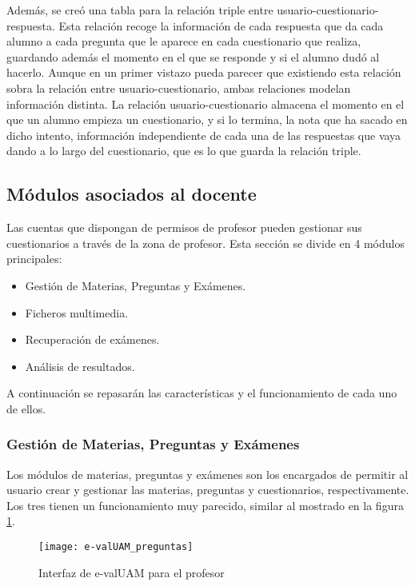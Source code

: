 Además, se creó una tabla para la relación triple entre usuario-cuestionario-respuesta. Esta relación recoge la información de cada respuesta que da cada alumno a cada pregunta que le aparece en cada cuestionario que realiza, guardando además el momento en el que se responde y si el alumno dudó al hacerlo. Aunque en un primer vistazo pueda parecer que existiendo esta relación sobra la relación entre usuario-cuestionario, ambas relaciones modelan información distinta. La relación usuario-cuestionario almacena el momento en el que un alumno empieza un cuestionario, y si lo termina, la nota que ha sacado en dicho intento, información independiente de cada una de las respuestas que vaya dando a lo largo del cuestionario, que es lo que guarda la relación triple.


\subsection{Módulos asociados al docente}

Las cuentas que dispongan de permisos de profesor pueden gestionar sus cuestionarios a través de la zona de profesor. Esta sección se divide en 4 módulos principales:

\begin{itemize}
	\item Gestión de Materias, Preguntas y Exámenes.
	\item Ficheros multimedia.
	\item Recuperación de exámenes.
	\item Análisis de resultados.
\end{itemize}

A continuación se repasarán las características y el funcionamiento de cada uno de ellos.

\subsubsection{Gestión de Materias, Preguntas y Exámenes}

Los módulos de materias, preguntas y exámenes son los encargados de permitir al usuario crear y gestionar las materias, preguntas y cuestionarios, respectivamente. Los tres tienen un funcionamiento muy parecido, similar al mostrado en la figura \ref{fig:e-valUAM interfaz profesor}.

\begin{figure}[htp!]
	\centering
	\texttt{[image: e-valUAM\_preguntas]}
	\caption{Interfaz de e-valUAM para el profesor}
	\label{fig:e-valUAM interfaz profesor}
\end{figure}


